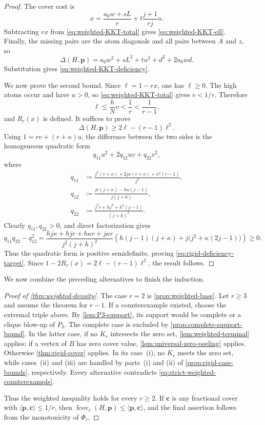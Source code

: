 \documentclass[10pt]{article}
\numberwithin{equation}{section}
\newcommand{\fcov}{\operatorname{fcov}}
\newcommand{\vct}[1]{\boldsymbol{#1}}
\begin{document}
\begin{proof}
The cover cost is
\[
 x=\frac{a_0w+sL}{r}+t\frac{j+1}{rj}u.
\]
Subtracting $rx$ from \cref{eq:weighted-KKT-total} gives \cref{eq:weighted-KKT-ell}.  Finally, the missing pairs are the atom diagonals and all pairs between $A$ and $z$, so
\[
 \Delta(H,\vct p)=a_0w^2+sL^2+tu^2+d^2+2a_0wd.
\]
Substitution gives \cref{eq:weighted-KKT-deficiency}.

We now prove the second bound.  Since $\ell=1-rx$, one has $\ell\ge0$.  The high atoms occur and have $u>0$, so \cref{eq:weighted-KKT-total} gives $v<1/r$.  Therefore
\[
 \ell\le\frac hNv<\frac1r<\frac1{r-1},
\]
and $R_r(x)$ is defined.  It suffices to prove
\begin{equation}\label{eq:rigid-deficiency-target}
 \Delta(H,\vct p)\ge2\ell-(r-1)\ell^2.
\end{equation}
Using $1=rv+(r+\kappa)u$, the difference between the two sides is the homogeneous quadratic form
\[
 q_{11}u^2+2q_{12}uv+q_{22}v^2,
\]
where
\begin{align*}
 q_{11}&\coloneqq\frac{j^2(r+\kappa)+2j\kappa(r+\kappa)
          +\kappa^2(r-1)}{j^2},\\
 q_{12}&\coloneqq\frac{jr(j+\kappa)-h\kappa(j-1)}{j(j+h)},\\
 q_{22}&\coloneqq\frac{j^2r+hj^2+h^2(j-1)}{(j+h)^2}.
\end{align*}
Clearly $q_{11},q_{22}>0$, and direct factorization gives
\[
 q_{11}q_{22}-q_{12}^2
 =\frac{hj\kappa+hjr+h\kappa r+j\kappa r}
        {j^2(j+h)^2}
 \left(h(j-1)(j+\kappa)+j\bigl(j^2+\kappa(2j-1)\bigr)\right)\ge0.
\]
Thus the quadratic form is positive semidefinite, proving \cref{eq:rigid-deficiency-target}.  Since $1-2R_r(x)=2\ell-(r-1)\ell^2$, the result follows.
\end{proof}

We now combine the preceding alternatives to finish the induction.

\begin{proof}[Proof of \cref{thm:weighted-density}]
The case $r=2$ is \cref{prop:weighted-base}.  Let $r\ge3$ and assume the theorem for $r-1$.  If a counterexample existed, choose the extremal triple above.  By \cref{lem:P3-support}, its support would be complete or a clique blow-up of $P_3$.  The complete case is excluded by \cref{prop:complete-support-bound}.  In the latter case, if no $K_r$ intersects the zero set, \cref{lem:weighted-terminal} applies; if a vertex of $B$ has zero cover value, \cref{lem:universal-zero-peeling} applies.  Otherwise \cref{thm:rigid-cover} applies.  In its case~\textup{(i)}, no $K_r$ meets the zero set, while cases~\textup{(ii)} and \textup{(iii)} are handled by parts~\textup{(i)} and \textup{(ii)} of \cref{prop:rigid-case-bounds}, respectively.  Every alternative contradicts \cref{eq:strict-weighted-counterexample}.

Thus the weighted inequality holds for every $r\ge2$.  If $\vct c$ is any fractional cover with $\langle\vct p,\vct c\rangle\le1/r$, then $\fcov_r(H,\vct p)\le\langle\vct p,\vct c\rangle$, and the final assertion follows from the monotonicity of $\Phi_r$.
\end{proof}
\end{document}
